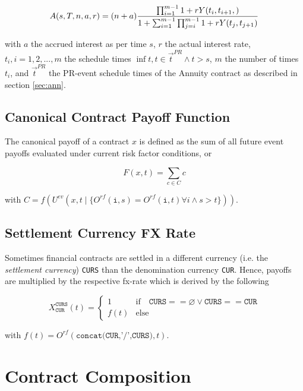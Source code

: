 \documentclass[9pt,oneside]{amsart}
\newcommand{\attr}[1]{\texttt{#1}}
\newcommand{\yfr}[2]{Y(#1,#2)}
\newcommand{\ann}[5]{A(#1,#2,#3,#4,#5)}
\newcommand{\obs}[3]{O^{#1}(#2,#3)}
\newcommand{\cldev}[3]{U^{ev}(#1,#2 \mid\{#3\})}
\newcommand{\undef}{\varnothing}
\newcommand{\fev}[1]{f(#1)}
\newcommand{\payoff}[2]{F(#1,#2)}
\begin{document}
\begin{multicols}{2}
\[
	\ann{s}{T}{n}{a}{r}=(n+a)\frac{\prod_{i=1}^{m-1}1+r\yfr{t_i,t_{i+1}}}{1+\sum_{i=1}^{m-1}\prod_{j=i}^{m-1}1+r\yfr{t_j}{t_{j+1}}}
\]

with $a$ the accrued interest as per time $s$, $r$ the actual interest rate, $t_i, i=1,2,...,m$ the schedule times $\inf t, t\in\vec{t}^{PR}\land t>s$, $m$ the number of times $t_i$, and $\vec{t}^{PR}$ the PR-event schedule times of the Annuity contract as described in section \ref{sec:ann}.


\subsection{Canonical Contract Payoff Function}

The canonical payoff of a contract $x$ is defined as the sum of all future event payoffs evaluated under current risk factor conditions, or

\[
  \payoff{x}{t} = \sum_{c\in C} c
\]

with $C=\fev{\cldev{x}{t}{\obs{rf}{\attr{i}}{s}=\obs{rf}{\attr{i}}{t}\forall i \wedge s>t}}$.


\subsection{Settlement Currency FX Rate}\label{sec:settlement-cur}

Sometimes financial contracts are settled in a different currency (i.e. the \textit{settlement currency}) \attr{CURS} than the denomination currency \attr{CUR}. Hence, payoffs are multiplied by the respective fx-rate which is derived by the following

\[
	X_{\attr{CUR}}^{\attr{CURS}}(t)	= \begin{cases} 1 &\text{if}\quad \attr{CURS} == \undef \vee \attr{CURS} == \attr{CUR} \\
	f(t) &\text{else} \end{cases}
\]

with $f(t)=\obs{rf}{\attr{concat(CUR,'/',CURS)}}{t}$.



\section{Contract Composition}\label{sec:composition}


\end{multicols}
\end{document}

